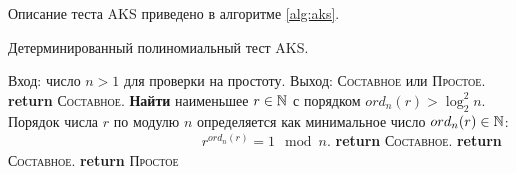Описание теста AKS приведено в алгоритме \ref{alg:aks}.

\begin{algorithm}[!ht]
    \caption{Детерминированный полиномиальный тест AKS.\label{alg:aks}}
    \begin{algorithmic}
        \STATE Вход: число $n>1$ для проверки на простоту.
        \STATE Выход: \textsc{Составное} или \textsc{Простое}.
           \STATE \textbf{return} \textsc{Составное}.
        \ENDIF
        \STATE \textbf{Найти} наименьшее $r \in \mathbb{N}$ с порядком $ord_n(r) > \log_2^2 n$. Порядок числа $r$ по модулю $n$ определяется как минимальное число $ord_n(r) \in \mathbb{N}$: \\
            \indent ~~~~~~~~~~~~~~~~~~~~~~~~~~~ $r^{ord_n(r)} = 1 \mod n$.
           \STATE \textbf{return} \textsc{Составное}.
        \ENDIF
                \STATE \textbf{return} \textsc{Составное}.
            \ENDIF
        \ENDFOR
        \STATE \textbf{return} \textsc{Простое}
    \end{algorithmic}
\end{algorithm}
